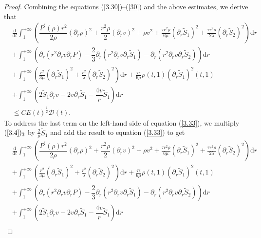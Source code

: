 \documentclass[10pt,reqno]{amsart}
\numberwithin{equation}{section}
\begin{document}
\begin{proof}
		Combining the equations (\ref{3.30})--(\ref{30}) and the above estimates, we derive that
		\begin{equation}\label{3.33}
			\begin{aligned}
				&\frac{\mathrm{d}}{\mathrm{d} t}\int_{1}^{+\infty}(\dfrac{P^{\prime}(\rho)r^2}{2\rho}\left(\partial_r \rho\right)^2+\dfrac{r^2\rho}{2} (\partial_{r}v)^2+\rho v^2
				+ \frac{\tau r^2\rho}{6\mu}(\partial_r \tilde{S}_1)^2
				+ \frac{\tau r^2\rho}{2\lambda}(\partial_r \tilde{S}_2)^2) \mathrm{d}r\\
				&
				+ \int_{1}^{+\infty}(\partial_{r}(r^2\partial_{r} v  \partial_r P)	-\dfrac{2}{3}\partial_{r}(r^2\partial_{r}v\partial_{r}\tilde{S}_1)-\partial_{r}(r^2\partial_{r}v\partial_{r}\tilde{S}_2))\mathrm{d}r\\
				&+\int_{1}^{+\infty}(\frac{r^2}{3\mu}(\partial_r \tilde{S}_1)^2+\frac{r^2}{\lambda}(\partial_r \tilde{S}_2)^2)\mathrm{d}r
				+\frac{\tau\epsilon}{6\mu}\rho(t,1)(\partial_{r}\tilde{S}_1)^2(t,1)
				\\
				&+\int_{1}^{+\infty}\left(2\tilde{S}_1\partial_{r}v-2v\partial_r \tilde{S}_1-\dfrac{4 v }{r}\tilde{S}_1\right)\mathrm{d}r\\
				&\leq C E(t)^{\frac{1}{2}}\mathcal{D}(t).
			\end{aligned}
		\end{equation}
		To address the last term on the left-hand side of equation (\ref{3.33}), we
		multiply $(\ref{3.4})_3$ by $\frac{2}{\mu}\tilde{S}_1$ and add the result to equation (\ref{3.33}) to get
		\begin{equation}\label{3.34}
			\begin{aligned}
				&\frac{\mathrm{d}}{\mathrm{d} t}\int_{1}^{+\infty}(\dfrac{P^{\prime}(\rho)r^2}{2\rho}\left(\partial_r \rho\right)^2+\dfrac{r^2\rho}{2} (\partial_{r}v)^2+\rho v^2
				+ \frac{\tau r^2\rho}{6\mu}(\partial_r \tilde{S}_1)^2
				+ \frac{\tau r^2\rho}{2\lambda}(\partial_r \tilde{S}_2)^2) \mathrm{d}r\\
				&+\int_{1}^{+\infty}(\frac{r^2}{3\mu}(\partial_r \tilde{S}_1)^2+\frac{r^2}{\lambda}(\partial_r \tilde{S}_2)^2)\mathrm{d}r
				+\frac{\tau\epsilon}{6\mu}\rho(t,1)(\partial_{r}\tilde{S}_1)^2 (t,1)
				\\
				&
				+ \int_{1}^{+\infty}\left(\partial_{r}(r^2\partial_{r} v  \partial_r P)	-\dfrac{2}{3}\partial_{r}(r^2\partial_{r}v\partial_{r}\tilde{S}_1)-\partial_{r}(r^2\partial_{r}v\partial_{r}\tilde{S}_2)\right)\mathrm{d}r\\
				&+\int_{1}^{+\infty}\left(2\tilde{S}_1\partial_{r}v-2v\partial_r \tilde{S}_1-\dfrac{4 v }{r}\tilde{S}_1\right)\mathrm{d}r\\

\end{aligned}
\end{equation}
\end{proof}
\end{document}
